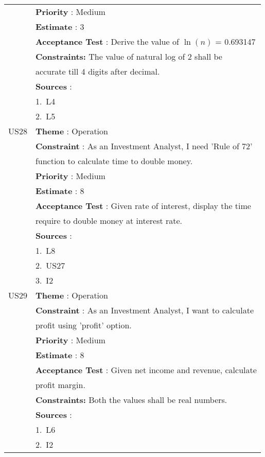 \documentclass{article}
\begin{document}
\begin{longtable}{|| c || l ||}
         & \textbf{Priority} : Medium \\
         & \textbf{Estimate} : 3 \\
         & \textbf{Acceptance Test} : Derive the value of $\ln(n)$ = 0.693147\\
         & \textbf{Constraints: } The value of natural log of 2 shall be \\
         & accurate till 4 digits after decimal.\\
         & \textbf{Sources} : \\
         & 1.~L4\\
         & 2.~L5\\
         \hline
         US28 & \textbf{Theme} : Operation \\
         & \textbf{Constraint} : As an Investment Analyst, I need 'Rule of 72' \\
         & function to calculate time to double money.\\
         & \textbf{Priority} : Medium \\
         & \textbf{Estimate} : 8 \\
         & \textbf{Acceptance Test} : Given rate of interest, display the time\\
         & require to double money at interest rate.\\
         & \textbf{Sources} : \\
         & 1.~L8\\
         & 2.~US27\\
         & 3.~I2 \\
         \hline
         \newpage
         \hline
         US29 & \textbf{Theme} : Operation \\
         & \textbf{Constraint} : As an Investment Analyst, I want to calculate \\
         & profit using 'profit' option.\\
         & \textbf{Priority} : Medium \\
         & \textbf{Estimate} : 8 \\
         & \textbf{Acceptance Test} : Given net income and revenue, calculate\\
         & profit margin.\\
         & \textbf{Constraints: } Both the values shall be real numbers.\\
         & \textbf{Sources} : \\
         & 1.~L6\\
         & 2.~I2 \\

\end{longtable}
\end{document}
